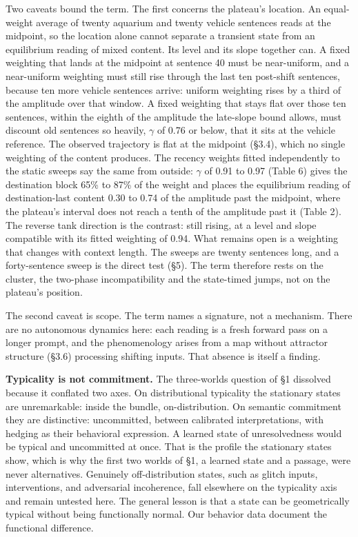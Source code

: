 \documentclass[11pt]{article}
\begin{document}
Two caveats bound the term. The first concerns the plateau's location. An equal-weight average of twenty aquarium and twenty vehicle sentences reads at the midpoint, so the location alone cannot separate a transient state from an equilibrium reading of mixed content. Its level and its slope together can. A fixed weighting that lands at the midpoint at sentence 40 must be near-uniform, and a near-uniform weighting must still rise through the last ten post-shift sentences, because ten more vehicle sentences arrive: uniform weighting rises by a third of the amplitude over that window. A fixed weighting that stays flat over those ten sentences, within the eighth of the amplitude the late-slope bound allows, must discount old sentences so heavily, $\gamma$ of 0.76 or below, that it sits at the vehicle reference. The observed trajectory is flat at the midpoint (\S3.4), which no single weighting of the content produces. The recency weights fitted independently to the static sweeps say the same from outside: $\gamma$ of 0.91 to 0.97 (Table 6) gives the destination block 65\% to 87\% of the weight and places the equilibrium reading of destination-last content 0.30 to 0.74 of the amplitude past the midpoint, where the plateau's interval does not reach a tenth of the amplitude past it (Table 2). The reverse tank direction is the contrast: still rising, at a level and slope compatible with its fitted weighting of 0.94. What remains open is a weighting that changes with context length. The sweeps are twenty sentences long, and a forty-sentence sweep is the direct test (\S5). The term therefore rests on the cluster, the two-phase incompatibility and the state-timed jumps, not on the plateau's position.

The second caveat is scope. The term names a signature, not a mechanism. There are no autonomous dynamics here: each reading is a fresh forward pass on a longer prompt, and the phenomenology arises from a map without attractor structure (\S3.6) processing shifting inputs. That absence is itself a finding.

\textbf{Typicality is not commitment.} The three-worlds question of \S1 dissolved because
it conflated two axes. On distributional typicality the stationary states are
unremarkable: inside the bundle, on-distribution. On semantic commitment they are
distinctive: uncommitted, between calibrated interpretations, with hedging as their
behavioral expression. A learned state of unresolvedness would be typical and
uncommitted at once. That is the profile the stationary states show, which is why the first two worlds of
\S1, a learned state and a passage, were never alternatives. Genuinely off-distribution states, such as glitch inputs,
interventions, and adversarial incoherence, fall elsewhere on the typicality axis and
remain untested here. The general lesson is that a state can be geometrically typical
without being functionally normal. Our behavior data document the functional
difference.
\end{document}
